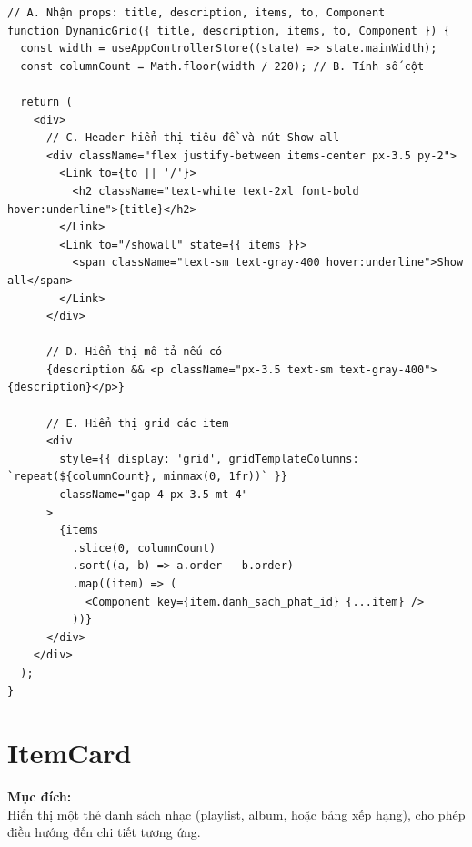 \begin{enumerate}
\begin{verbatim}
// A. Nhận props: title, description, items, to, Component
function DynamicGrid({ title, description, items, to, Component }) {
  const width = useAppControllerStore((state) => state.mainWidth);
  const columnCount = Math.floor(width / 220); // B. Tính số cột

  return (
    <div>
      // C. Header hiển thị tiêu đề và nút Show all
      <div className="flex justify-between items-center px-3.5 py-2">
        <Link to={to || '/'}>
          <h2 className="text-white text-2xl font-bold hover:underline">{title}</h2>
        </Link>
        <Link to="/showall" state={{ items }}>
          <span className="text-sm text-gray-400 hover:underline">Show all</span>
        </Link>
      </div>

      // D. Hiển thị mô tả nếu có
      {description && <p className="px-3.5 text-sm text-gray-400">{description}</p>}

      // E. Hiển thị grid các item
      <div
        style={{ display: 'grid', gridTemplateColumns: `repeat(${columnCount}, minmax(0, 1fr))` }}
        className="gap-4 px-3.5 mt-4"
      >
        {items
          .slice(0, columnCount)
          .sort((a, b) => a.order - b.order)
          .map((item) => (
            <Component key={item.danh_sach_phat_id} {...item} />
          ))}
      </div>
    </div>
  );
}
\end{verbatim}

\end{enumerate}

\section{ItemCard}

\textbf{Mục đích:} \\
Hiển thị một thẻ danh sách nhạc (playlist, album, hoặc bảng xếp hạng), cho phép điều hướng đến chi tiết tương ứng.

